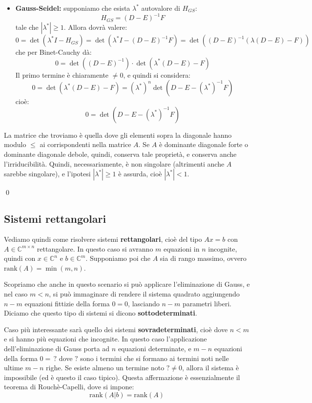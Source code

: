 \documentclass[a4paper,11pt]{article}
\begin{document}
\begin{enumerate}
\begin{itemize}
\item \textbf{Gauss-Seidel:} supponiamo che esista $\lambda^*$ autovalore di $H_{GS}$:
$$
H_{GS} = (D - E)^{-1} F
$$
tale che $|\lambda^*| \geq 1$.
Allora dovrà valere:
$$
0 = \det(\lambda^* I - H_{GS}) = \det\left (\lambda^* I - (D - E)^{-1} F \right) = \det \left( (D- E)^{-1} \left( \lambda(D - E) - F \right) \right)
$$
che per Binet-Cauchy dà:
$$
0 = \det \left( (D - E)^{-1} \right) \cdot \det \left(\lambda^* (D - E) - F \right)
$$
Il primo termine è chiaramente $\neq 0$, e quindi si considera:
$$
0 = \det \left( \lambda^* (D - E) - F \right) = \left(\lambda^*\right)^n \det \left(D - E - (\lambda^*)^{-1} F \right)
$$
cioè:
$$
0 = \det \left(D - E - (\lambda^*)^{-1} F \right)
$$
\end{itemize}
La matrice che troviamo è quella dove gli elementi sopra la diagonale hanno modulo $\leq$ ai corrispondenti nella matrice $A$.
Se $A$ è dominante diagonale forte o dominante diagonale debole, quindi, conserva tale proprietà, e conserva anche l'irriducibilità.
Quindi, necessariamente, è non singolare (altrimenti anche $A$ sarebbe singolare), e l'ipotesi $|\lambda^*| \geq 1$ è assurda, cioè $|\lambda^*| < 1$.
\end{enumerate} \qed

\subsection{Sistemi rettangolari}
Vediamo quindi come risolvere sistemi \textbf{rettangolari}, cioè del tipo $Ax = b$ con $A \in \mathbb{C}^{m \times n}$ rettangolare.
In questo caso si avranno $m$ equazioni in $n$ incognite, quindi con $x \in \mathbb{C}^n$ e $b \in \mathbb{C}^m$.
Supponiamo poi che $A$ sia di rango massimo, ovvero $\mathrm{rank}(A) = \min(m, n)$.

Scopriamo che anche in questo scenario si può applicare l'eliminazione di Gauss, e nel caso $m < n$, si può immaginare di rendere il sistema quadrato aggiungendo $n - m$ equazioni fittizie della forma $0 = 0$, lasciando $n - m$ parametri liberi.
Diciamo che questo tipo di sistemi si dicono \textbf{sottodeterminati}.

Caso più interessante sarà quello dei sistemi \textbf{sovradeterminati}, cioè dove $n < m$ e si hanno più equazioni che incognite.
In questo caso l'applicazione dell'eliminazione di Gauss porta ad $n$ equazioni determinate, e $m  - n$ equazioni della forma $0 = \, ?$ dove $?$ sono i termini che si formano ai termini noti nelle ultime $m - n$ righe.
Se esiste almeno un termine noto $? \neq 0$, allora il sistema è impossibile (ed è questo il caso tipico).
Questa affermazione è essenzialmente il teorema di Rouchè-Capelli, dove si impone:
$$
\mathrm{rank}(A | b) = \mathrm{rank}(A)
$$
\end{document}
